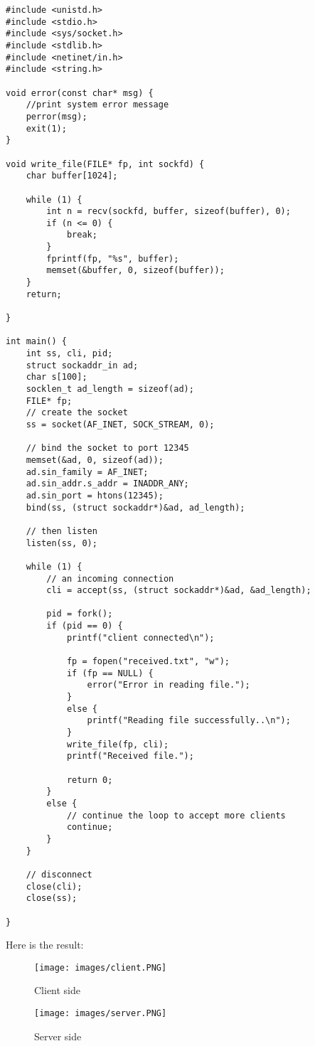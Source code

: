 \documentclass[13pt]{article}
\begin{document}
\begin{verbatim}
#include <unistd.h>
#include <stdio.h>
#include <sys/socket.h>
#include <stdlib.h>
#include <netinet/in.h>
#include <string.h>

void error(const char* msg) {
	//print system error message
	perror(msg);
	exit(1);
}

void write_file(FILE* fp, int sockfd) {
	char buffer[1024];

	while (1) {
		int n = recv(sockfd, buffer, sizeof(buffer), 0);
		if (n <= 0) {
			break;
		}
		fprintf(fp, "%s", buffer);
		memset(&buffer, 0, sizeof(buffer));
	}
	return;

}

int main() {
	int ss, cli, pid;
	struct sockaddr_in ad;
	char s[100];
	socklen_t ad_length = sizeof(ad);
	FILE* fp;
	// create the socket
	ss = socket(AF_INET, SOCK_STREAM, 0);

	// bind the socket to port 12345
	memset(&ad, 0, sizeof(ad));
	ad.sin_family = AF_INET;
	ad.sin_addr.s_addr = INADDR_ANY;
	ad.sin_port = htons(12345);
	bind(ss, (struct sockaddr*)&ad, ad_length);

	// then listen
	listen(ss, 0);

	while (1) {
		// an incoming connection
		cli = accept(ss, (struct sockaddr*)&ad, &ad_length);

		pid = fork();
		if (pid == 0) {
			printf("client connected\n");

			fp = fopen("received.txt", "w");
			if (fp == NULL) {
				error("Error in reading file.");
			}
			else {
				printf("Reading file successfully..\n");
			}
			write_file(fp, cli);
			printf("Received file.");

			return 0;
		}
		else {
			// continue the loop to accept more clients
			continue;
		}
	}

	// disconnect
	close(cli);
	close(ss);

}
\end{verbatim}
\noindent%
Here is the result:
\begin{figure}[H]
    \centering
    \texttt{[image: images/client.PNG]}
    \caption{Client side}
\end{figure}

\begin{figure}[H]
    \centering
    \texttt{[image: images/server.PNG]}
    \caption{Server side}
\end{figure}
\end{document}
